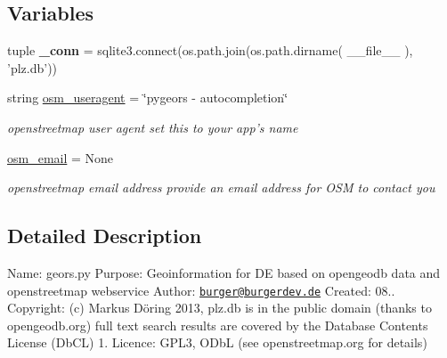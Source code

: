 \subsection*{Variables}
\begin{DoxyCompactItemize}
\item 
\hypertarget{namespacegeors_a8b633d071062d35496cc4c35670725de}{tuple {\bfseries \-\_\-conn} = sqlite3.\-connect(os.\-path.\-join(os.\-path.\-dirname( \-\_\-\-\_\-file\-\_\-\-\_\- ), 'plz.\-db'))}\label{namespacegeors_a8b633d071062d35496cc4c35670725de}

\item 
\hypertarget{namespacegeors_ac1a31bbbc06a9fd9bfdc8860c3a61e0c}{string \hyperlink{namespacegeors_ac1a31bbbc06a9fd9bfdc8860c3a61e0c}{osm\-\_\-useragent} = \char`\"{}pygeors -\/ autocompletion\char`\"{}}\label{namespacegeors_ac1a31bbbc06a9fd9bfdc8860c3a61e0c}

\begin{DoxyCompactList}\small\item\em openstreetmap user agent set this to your app's name \end{DoxyCompactList}\item 
\hypertarget{namespacegeors_a61e250eb73c709b7c855e9e96b0a3fcd}{\hyperlink{namespacegeors_a61e250eb73c709b7c855e9e96b0a3fcd}{osm\-\_\-email} = None}\label{namespacegeors_a61e250eb73c709b7c855e9e96b0a3fcd}

\begin{DoxyCompactList}\small\item\em openstreetmap email address provide an email address for O\-S\-M to contact you \end{DoxyCompactList}\end{DoxyCompactItemize}


\subsection{Detailed Description}
Name\-: geors.\-py Purpose\-: Geoinformation for D\-E based on opengeodb data and openstreetmap webservice Author\-: \href{mailto:burger@burgerdev.de}{\tt burger@burgerdev.\-de} Created\-: 08.. Copyright\-: (c) Markus Döring 2013, plz.\-db is in the public domain (thanks to opengeodb.\-org) full text search results are covered by the Database Contents License (Db\-C\-L) 1. Licence\-: G\-P\-L3, O\-Db\-L (see openstreetmap.\-org for details) 

